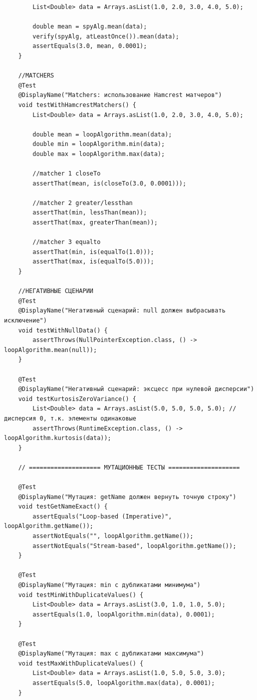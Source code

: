\begin{verbatim}
        List<Double> data = Arrays.asList(1.0, 2.0, 3.0, 4.0, 5.0);

        double mean = spyAlg.mean(data);
        verify(spyAlg, atLeastOnce()).mean(data);
        assertEquals(3.0, mean, 0.0001);
    }

    //MATCHERS
    @Test
    @DisplayName("Matchers: использование Hamcrest матчеров")
    void testWithHamcrestMatchers() {
        List<Double> data = Arrays.asList(1.0, 2.0, 3.0, 4.0, 5.0);

        double mean = loopAlgorithm.mean(data);
        double min = loopAlgorithm.min(data);
        double max = loopAlgorithm.max(data);

        //matcher 1 closeTo
        assertThat(mean, is(closeTo(3.0, 0.0001)));

        //matcher 2 greater/lessthan
        assertThat(min, lessThan(mean));
        assertThat(max, greaterThan(mean));

        //matcher 3 equalto
        assertThat(min, is(equalTo(1.0)));
        assertThat(max, is(equalTo(5.0)));
    }

    //НЕГАТИВНЫЕ СЦЕНАРИИ
    @Test
    @DisplayName("Негативный сценарий: null должен выбрасывать исключение")
    void testWithNullData() {
        assertThrows(NullPointerException.class, () -> loopAlgorithm.mean(null));
    }

    @Test
    @DisplayName("Негативный сценарий: эксцесс при нулевой дисперсии")
    void testKurtosisZeroVariance() {
        List<Double> data = Arrays.asList(5.0, 5.0, 5.0, 5.0); //дисперсия 0, т.к. элементы одинаковые
        assertThrows(RuntimeException.class, () -> loopAlgorithm.kurtosis(data));
    }

    // ==================== МУТАЦИОННЫЕ ТЕСТЫ ====================

    @Test
    @DisplayName("Мутация: getName должен вернуть точную строку")
    void testGetNameExact() {
        assertEquals("Loop-based (Imperative)", loopAlgorithm.getName());
        assertNotEquals("", loopAlgorithm.getName());
        assertNotEquals("Stream-based", loopAlgorithm.getName());
    }

    @Test
    @DisplayName("Мутация: min с дубликатами минимума")
    void testMinWithDuplicateValues() {
        List<Double> data = Arrays.asList(3.0, 1.0, 1.0, 5.0);
        assertEquals(1.0, loopAlgorithm.min(data), 0.0001);
    }

    @Test
    @DisplayName("Мутация: max с дубликатами максимума")
    void testMaxWithDuplicateValues() {
        List<Double> data = Arrays.asList(1.0, 5.0, 5.0, 3.0);
        assertEquals(5.0, loopAlgorithm.max(data), 0.0001);
    }


\end{verbatim}
